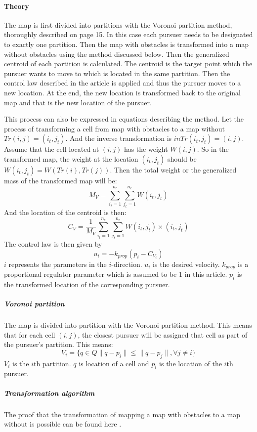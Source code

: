 \documentclass[ebook,11pt] {kth-mag}
\begin{document}
\paragraph{Theory}
The map is first divided into partitions with the Voronoi partition method, thoroughly described on page 15. In this case each pursuer needs to be designated to exactly one partition. Then the map with obstacles is transformed into a map without obstacles using the method discussed below. Then the generalized centroid of each partition is calculated. The centroid is the target point which the pursuer wants to move to which is located in the same partition. Then the control law described in the article \cite{cov} is applied and thus the pursuer moves to a new location. At the end, the new location is transformed back to the original map and that is the new location of the pursuer. 


This process can also be expressed in equations describing the method. Let the process of transforming a cell from map with obstacles to a map without $Tr(i,j) = (i_t, j_t)$. And the inverse transformation is $inTr(i_t, j_t) = (i,j)$. Assume that the cell located at $(i, j)$ has the weight $W(i, j)$. So in the transformed map, the weight at the location $(i_t, j_t)$ should be $W(i_t, j_t) = W(Tr(i), Tr(j))$. Then the total weight or the generalized mass of the transformed map will be:
$$
M_V = \sum_{i_t=1}^{n_e} \sum_{j_t=1}^{n_e} W(i_t, j_t)
$$
And the location of the centroid is then:
$$
C_V = \frac{1}{M_V} \sum_{i_t=1}^{n_e} \sum_{j_t=1}^{n_e} W(i_t, j_t)\times (i_t, j_t)
$$
The control law is then given by 
$$
u_i = -k_{prop} (p_i-C_{V_i})
$$
$i$ represents the parameters in the $i$-direction. $u_i$ is the desired velocity. $k_{prop}$ is a proportional regulator parameter which is assumed to be $1$ in this article. $p_i$ is the transformed location of the corresponding pursuer. 

\subparagraph{Voronoi partition}
The map is divided into partition with the Voronoi partition method. This means that for each cell $(i,j)$, the closest pursuer will be assigned that cell as part of the pursuer's partition. This means: 
$$
V_i=\{ q \in Q \parallel q-p_i \parallel \leq \parallel q-p_j\parallel, \forall j \neq i\}
$$
$V_i$ is the $i$th partition. $q$ is location of a cell and $p_i$ is the location of the $i$th pursuer. 

\subparagraph{Transformation algorithm}
The proof that the transformation of mapping a map with obstacles to a map without is possible can be found here \cite{noncov}. 
\end{document}
